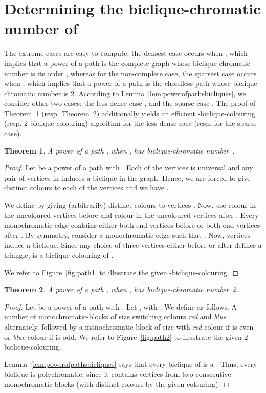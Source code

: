 \documentclass{article}
\newtheorem{theorem}{Theorem}
\begin{document}
\section{Determining the biclique-chromatic number of~}
\label{sec:kappabpowerofpath}

The extreme cases are easy to compute: the densest case occurs when
, which implies that a power of a path  is the complete
graph  whose biclique-chromatic number is its order , whereas for the non-complete case, the
sparsest case  occurs when , which implies that a power of a path
 is the chordless path  whose biclique-chromatic number is 2.
According to Lemma~\ref{lem:powerofpathsbicliques}, we consider other two cases:
the less dense case , and the sparse case . The proof of
Theorem~\ref{thm:kappabpowerofpathfirstinterval} (resp.
Theorem~\ref{thm:kappabpowerofpathsecondinterval})
additionally yields an efficient -biclique-colouring (resp.
2-biclique-colouring) algorithm for the less dense case (resp. for the sparse
case).


\begin{theorem}
\label{thm:kappabpowerofpathfirstinterval}
 A power of a path , when , has
 biclique-chromatic number~.
\end{theorem}

\begin{proof}
Let  be a power of a path  with .
Each of the vertices  is universal and any pair of
vertices in  induces a  biclique in the
graph. Hence, we are forced to give distinct colours to each of the vertices
 and we have .
 
We define  by giving
(arbitrarily) distinct colours  to vertices . Now, use colour  in the uncoloured vertices before  and colour  in the uncoloured vertices after . 
Every monochromatic edge contains either both end vertices before  or
both end vertices after . By symmetry, consider  a
monochromatic edge such that . Now, vertices  induce a  biclique. Since any choice of three vertices either before
 or after  defines a triangle,  is a
biclique-colouring of .

We refer to Figure~\ref{fig:path1} to illustrate the
given -biclique-colouring.
\end{proof}

\begin{theorem}
\label{thm:kappabpowerofpathsecondinterval}
 A power of a path , when , has
 biclique-chromatic number~2.
\end{theorem}

\begin{proof}
Let  be a power of a path  with . 
Let , with . We define
 as follows. A number of 
monochromatic-blocks of size  switching colours \emph{red} and \emph{blue}
alternately, followed by a monochromatic-block of size  with \emph{red}
colour if  is even or \emph{blue} colour if  is odd.
We refer to Figure~\ref{fig:path2} to illustrate the given
2-biclique-colouring.

Lemma~\ref{lem:powerofpathsbicliques} says that every biclique of  is a
. Thus, every biclique is polychromatic, since it contains vertices from
two consecutive monochromatic-blocks (with distinct colours by the
given colouring).
\end{proof}
\end{document}
